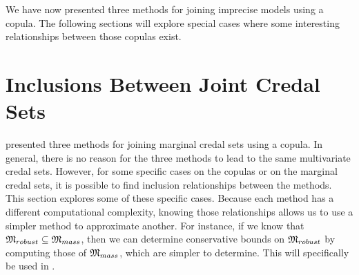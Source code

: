 We have now presented three methods for joining imprecise models using a copula. The following sections will explore special cases where some interesting relationships between those copulas exist. 

\section{Inclusions Between Joint Credal Sets}\label{sec:inclusions_between_methods}
 presented three methods for joining marginal credal sets using a copula. In general, there is no reason for the three methods to lead to the same multivariate credal sets. However, for some specific cases on the copulas or on the marginal credal sets, it is possible to find inclusion relationships between the methods. This section explores some of these specific cases. Because each method has a different computational complexity, knowing those relationships allows us to use a simpler method to approximate another. For instance, if we know that $\mathfrak{M}_{robust}\subseteq\mathfrak{M}_{mass}$, then we can determine conservative bounds on $\mathfrak{M}_{robust}$ by computing those of $\mathfrak{M}_{mass}$, which are simpler to determine. This will specifically be used in .

